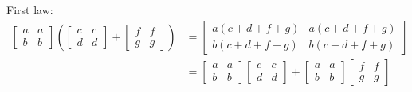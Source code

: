 \documentclass[paper=a4, fontsize=11pt]{jhwhw} %
\begin{document}
First law:
\begin{align*}
\left[ \begin{array}{cc}
a & a \\
b & b \end{array} \right]\left(
\left[ \begin{array}{cc}
c & c \\
d & d \end{array} \right] +
\left[ \begin{array}{cc}
f & f \\
g & g \end{array} \right]\right) &=
\left[ \begin{array}{cc}
a(c+d+f+g) & a(c+d+f+g)  \\
b(c+d+f+g)  & b(c+d+f+g)  \end{array} \right] \\
            &=
\left[ \begin{array}{cc}
a & a \\
b & b \end{array} \right]
\left[ \begin{array}{cc}
c & c \\
d & d \end{array} \right] +
\left[ \begin{array}{cc}
a & a \\
b & b \end{array} \right]
\left[ \begin{array}{cc}
f & f \\
g & g \end{array} \right]
\end{align*}
\end{document}
